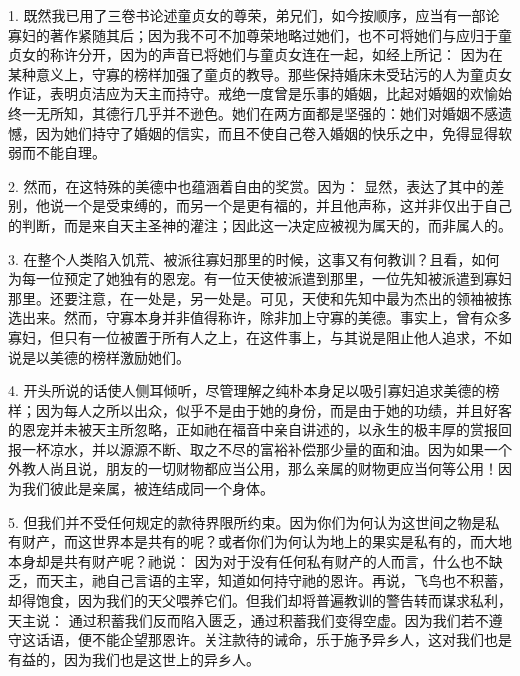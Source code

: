 1. 既然我已用了三卷书论述童贞女的尊荣，弟兄们，如今按顺序，应当有一部论寡妇的著作紧随其后；因为我不可不加尊荣地略过她们，也不可将她们与应归于童贞女的称许分开，因为的声音已将她们与童贞女连在一起，如经上所记：  因为在某种意义上，守寡的榜样加强了童贞的教导。那些保持婚床未受玷污的人为童贞女作证，表明贞洁应为天主而持守。戒绝一度曾是乐事的婚姻，比起对婚姻的欢愉始终一无所知，其德行几乎并不逊色。她们在两方面都是坚强的：她们对婚姻不感遗憾，因为她们持守了婚姻的信实，而且不使自己卷入婚姻的快乐之中，免得显得软弱而不能自理。\par

2. 然而，在这特殊的美德中也蕴涵着自由的奖赏。因为：  显然，表达了其中的差别，他说一个是受束缚的，而另一个是更有福的，并且他声称，这并非仅出于自己的判断，而是来自天主圣神的灌注；因此这一决定应被视为属天的，而非属人的。\par

3. 在整个人类陷入饥荒、被派往寡妇那里的时候，这事又有何教训？且看，如何为每一位预定了她独有的恩宠。有一位天使被派遣到那里，一位先知被派遣到寡妇那里。还要注意，在一处是，另一处是。可见，天使和先知中最为杰出的领袖被拣选出来。然而，守寡本身并非值得称许，除非加上守寡的美德。事实上，曾有众多寡妇，但只有一位被置于所有人之上，在这件事上，与其说是阻止他人追求，不如说是以美德的榜样激励她们。\par

4. 开头所说的话使人侧耳倾听，尽管理解之纯朴本身足以吸引寡妇追求美德的榜样；因为每人之所以出众，似乎不是由于她的身份，而是由于她的功绩，并且好客的恩宠并未被天主所忽略，正如祂在福音中亲自讲述的，以永生的极丰厚的赏报回报一杯凉水，并以源源不断、取之不尽的富裕补偿那少量的面和油。因为如果一个外教人尚且说，朋友的一切财物都应当公用，那么亲属的财物更应当何等公用！因为我们彼此是亲属，被连结成同一个身体。\par

5. 但我们并不受任何规定的款待界限所约束。因为你们为何认为这世间之物是私有财产，而这世界本是共有的呢？或者你们为何认为地上的果实是私有的，而大地本身却是共有财产呢？祂说： 因为对于没有任何私有财产的人而言，什么也不缺乏，而天主，祂自己言语的主宰，知道如何持守祂的恩许。再说，飞鸟也不积蓄，却得饱食，因为我们的天父喂养它们。但我们却将普遍教训的警告转而谋求私利，天主说： 通过积蓄我们反而陷入匮乏，通过积蓄我们变得空虚。因为我们若不遵守这话语，便不能企望那恩许。关注款待的诫命，乐于施予异乡人，这对我们也是有益的，因为我们也是这世上的异乡人。\par


